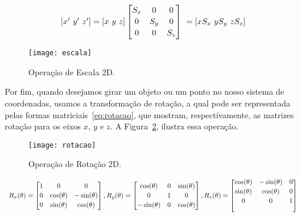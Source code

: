 \begin{equation}\label{eq:escala}
    \begin{array}{c c c}
    [x' \ y' \ z'] = [x \ y \ z]
    \begin{bmatrix}
     S_x & 0 & 0   \\[0.2em]
     0 & S_y & 0   \\[0.2em]
     0 & 0 & S_z
    \end{bmatrix}
    \
    = [xS_x\ yS_y\ zS_z]
    \end{array}
\end{equation}

\begin{figure}[ht!]
      \centering
	  \texttt{[image: escala]}
	  \caption{Operação de Escala 2D.}
	  \label{fg:escala}
\end{figure} 

Por fim, quando desejamos girar um objeto ou um ponto no nosso sistema de coordenadas, usamos a transformação de rotação, a qual pode ser representada pelas formas matriciais~\ref{eq:rotacao}, que mostram, respectivamente, as matrizes rotação para os eixos $x$, $y$ e $z$. A Figura~\ref{fg:rotacao}, ilustra essa operação.

\begin{figure}[ht!]
      \centering
	  \texttt{[image: rotacao]}
	  \caption{Operação de Rotação 2D.}
	  \label{fg:rotacao}
\end{figure} 
\begin{center}
\begin{equation}\label{eq:rotacao}
  \begin{array}{c c c}
     R_x(\theta) = \begin{bmatrix}
    1 & 0 & 0   \\[0.2em]
    0 & \cos(\theta) & -\sin(\theta)    \\[0.2em]
    0 & \sin(\theta) & \cos(\theta) \\
    \end{bmatrix}
    , 
    R_y(\theta) = \begin{bmatrix}
    \cos(\theta) & 0 & \sin(\theta) \\[0.2em]
    0 & 1 & 0   \\[0.2em]
    -\sin(\theta) & 0 & \cos(\theta)\\
    \end{bmatrix}
    ,
    R_z(\theta) = \begin{bmatrix}
    \cos(\theta) & -\sin(\theta) & 0\\[0.2em]
    \sin(\theta) & \cos(\theta) & 0\\[0.2em]
    0 & 0 & 1\\\ 
    \end{bmatrix}
    \end{array}
\end{equation}
\end{center}

